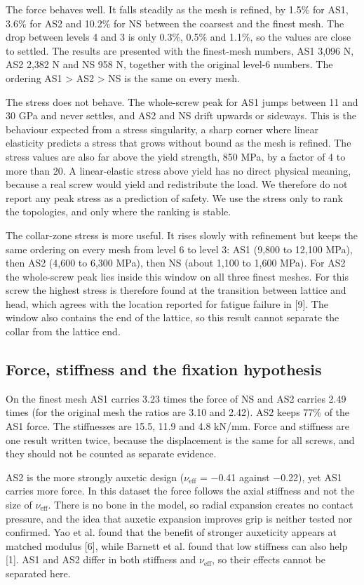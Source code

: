 \documentclass[10pt,twocolumn,letterpaper]{article}
\begin{document}
The force behaves well. It falls steadily as the mesh is refined, by 1.5\% for AS1, 3.6\% for AS2 and 10.2\% for NS between the coarsest and the finest mesh. The drop between levels 4 and 3 is only 0.3\%, 0.5\% and 1.1\%, so the values are close to settled. The results are presented with the finest-mesh numbers, AS1 3,096 N, AS2 2,382 N and NS 958 N, together with the original level-6 numbers. The ordering AS1 > AS2 > NS is the same on every mesh.

The stress does not behave. The whole-screw peak for AS1 jumps between 11 and 30 GPa and never settles, and AS2 and NS drift upwards or sideways. This is the behaviour expected from a stress singularity, a sharp corner where linear elasticity predicts a stress that grows without bound as the mesh is refined. The stress values are also far above the yield strength, 850 MPa, by a factor of 4 to more than 20. A linear-elastic stress above yield has no direct physical meaning, because a real screw would yield and redistribute the load. We therefore do not report any peak stress as a prediction of safety. We use the stress only to rank the topologies, and only where the ranking is stable.

The collar-zone stress is more useful. It rises slowly with refinement but keeps the same ordering on every mesh from level 6 to level 3: AS1 (9,800 to 12,100 MPa), then AS2 (4,600 to 6,300 MPa), then NS (about 1,100 to 1,600 MPa). For AS2 the whole-screw peak lies inside this window on all three finest meshes. For this screw the highest stress is therefore found at the transition between lattice and head, which agrees with the location reported for fatigue failure in [9]. The window also contains the end of the lattice, so this result cannot separate the collar from the lattice end.

\subsection{Force, stiffness and the fixation hypothesis}
On the finest mesh AS1 carries 3.23 times the force of NS and AS2 carries 2.49 times (for the original mesh the ratios are 3.10 and 2.42). AS2 keeps 77\% of the AS1 force. The stiffnesses are 15.5, 11.9 and 4.8 kN/mm. Force and stiffness are one result written twice, because the displacement is the same for all screws, and they should not be counted as separate evidence.

AS2 is the more strongly auxetic design ($\nu_{\mathrm{eff}}$ = $-$0.41 against $-$0.22), yet AS1 carries more force. In this dataset the force follows the axial stiffness and not the size of $\nu_{\mathrm{eff}}$. There is no bone in the model, so radial expansion creates no contact pressure, and the idea that auxetic expansion improves grip is neither tested nor confirmed. Yao et al. found that the benefit of stronger auxeticity appears at matched modulus [6], while Barnett et al. found that low stiffness can also help [1]. AS1 and AS2 differ in both stiffness and $\nu_{\mathrm{eff}}$, so their effects cannot be separated here.
\end{document}

